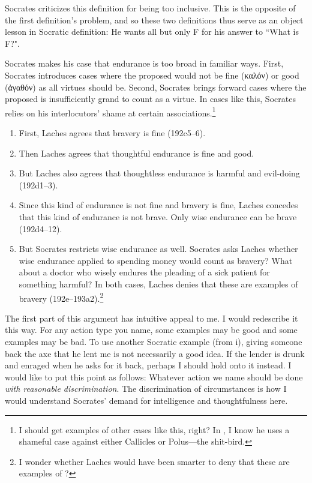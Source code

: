 \documentclass[11pt]{article}
\begin{document}
Socrates criticizes this definition for being too inclusive.  This is the
opposite of the first definition's problem, and so these two definitions
thus serve as an object lesson in Socratic definition: He wants all but
only F for his answer to ``What is F?".

Socrates makes his case that endurance is too broad in familiar ways.
First, Socrates introduces cases where the proposed 
would not be fine ({\g καλόν}) or good ({\g ἀγαθόν}) as all virtues should
be. Second, Socrates brings forward cases where the proposed
 is insufficiently grand to count as a virtue.  In cases
like this, Socrates relies on his interlocutors' shame at certain
associations.\footnote{I should get examples of other cases like this,
right?  In , I know he uses a shameful case against either
Callicles or Polus---the shit-bird.}

\begin{enumerate}

    \item First, Laches agrees that bravery is fine (192c5--6).

    \item Then Laches agrees that thoughtful endurance is fine and good.

    \item But Laches also agrees that thoughtless endurance is harmful and
        evil-doing (192d1--3).

    \item Since this kind of endurance is not fine and bravery is fine,
        Laches concedes that this kind of endurance is not brave.  Only
        wise endurance can be brave (192d4--12).

    \item But Socrates restricts wise endurance as well.  Socrates asks
        Laches whether wise endurance applied to spending money would count
        as bravery?  What about a doctor who wisely endures the pleading of
        a sick patient for something harmful?  In both cases, Laches denies
        that these are examples of bravery (192e--193a2).\footnote{I wonder
        whether Laches would have been smarter to deny that these are
        examples of ?}

\end{enumerate}

The first part of this argument has intuitive appeal to me.  I would
redescribe it this way.  For any action type you name, some examples may be
good and some examples may be bad.  To use another Socratic example (from
 i), giving someone back the axe that he lent me is not
necessarily a good idea.  If the lender is drunk and enraged when he asks
for it back, perhaps I should hold onto it instead.  I would like to put
this point as follows: Whatever action we name should be done \emph{with
reasonable discrimination}.  The discrimination of circumstances is how
I would understand Socrates' demand for intelligence and thoughtfulness
here.
\end{document}
